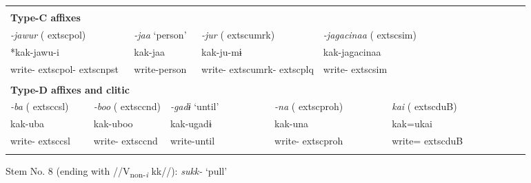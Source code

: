 \begin{tabularx}{\textwidth}{XXXXXXm{}XXXXXXXXXXXXXXXX}
\multicolumn{2}{X}{} & \multicolumn{6}{X}{} & \multicolumn{4}{X}{} & \multicolumn{4}{X}{} & \multicolumn{3}{X}{} & \multicolumn{2}{X}{} & \multicolumn{2}{X}{}\\
\multicolumn{23}{X}{{\bfseries Type-C affixes}}\\
\multicolumn{4}{X}{{ \textit{{}-jawur} (	extsc{pol})}} & \multicolumn{2}{X}{{ \textit{{}-jaa} ‘person’}} & \multicolumn{5}{X}{{ \textit{{}-jur} (	extsc{umrk})}} & \multicolumn{3}{X}{{ \textit{{}-jagacinaa} (	extsc{sim})}} & \multicolumn{9}{X}{}\\
\multicolumn{4}{X}{{ *kak-jawu-i}} & \multicolumn{2}{X}{kak-jaa} & \multicolumn{5}{X}{kak-ju-mɨ} & \multicolumn{3}{X}{{ kak-jagacinaa}} & \multicolumn{9}{X}{}\\
\multicolumn{4}{X}{write-	extsc{pol}-	extsc{npst}} & \multicolumn{2}{X}{write-person} & \multicolumn{5}{X}{write-	extsc{umrk}-	extsc{plq}} & \multicolumn{3}{X}{write-	extsc{sim}} & \multicolumn{9}{X}{}\\
\multicolumn{23}{X}{}\\
\multicolumn{23}{X}{{\bfseries Type-D affixes and clitic}}\\
{ \textit{{}-ba} (	extsc{csl})} & \multicolumn{4}{X}{{ \textit{{}-boo} (	extsc{cnd})}} & \multicolumn{4}{X}{{ \textit{{}-gadɨ} ‘until’}} & \multicolumn{4}{X}{{ \textit{{}-na} (	extsc{proh})}} & \multicolumn{4}{X}{{ \textit{kai} (	extsc{du}B)}} & \multicolumn{6}{X}{}\\
{ kak-uba} & \multicolumn{4}{X}{{ kak-uboo}} & \multicolumn{4}{X}{{ kak-ugadɨ}} & \multicolumn{4}{X}{{ kak-una}} & \multicolumn{4}{X}{{ kak=ukai}} & \multicolumn{6}{X}{}\\
write-	extsc{csl} & \multicolumn{4}{X}{write-	extsc{cnd}} & \multicolumn{4}{X}{write-until} & \multicolumn{4}{X}{write-	extsc{proh}} & \multicolumn{4}{X}{write=	extsc{du}B} & \multicolumn{6}{X}{}\\
\lspbottomrule
\end{tabularx}
Stem No. 8 (ending with //V\textsubscript{non-}\textit{\textsubscript{i} }kk//): \textit{sukk-} ‘pull’

\tablefirsthead{}

